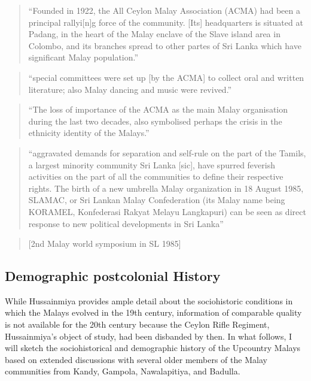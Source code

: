 \begin{quote}
    ``Founded in 1922, the All Ceylon Malay Association (ACMA) had been a principal rallyi[n]g force of the community. [Its] headquarters is situated at Padang, in the heart of the Malay enclave of the Slave island area in Colombo, and its branches spread to other partes of Sri Lanka which have significant Malay population.''\citet[21]{Hussainmiya1987}
\end{quote}



\begin{quote}
    ``special committees were set up [by the ACMA] to collect oral and written literature; also Malay dancing and music were revived.''\citet[21]{Hussainmiya1987}
\end{quote}

\begin{quote}
    ``The loss of importance of the ACMA as the main Malay organisation during the last two decades, also symbolised perhaps the crisis in the ethnicity identity of the Malays.''\citet[21]{Hussainmiya1987}
\end{quote}

\begin{quote}
    ``aggravated demands for separation and self-rule on the part of the Tamils, a largest minority community Sri Lanka [sic], have spurred feverish activities on the part of all the communities to define their respective rights. The birth of a new umbrella Malay organization in 18 August 1985, SLAMAC, or Sri Lankan Malay Confederation (its Malay name being KORAMEL, Konfederasi Rakyat Melayu Langkapuri) can be seen as direct response to new political developments in Sri Lanka''\citet[22]{Hussainmiya1987}
\end{quote}

\begin{quote}
    [2nd  Malay world symposium in SL 1985]
\end{quote}

\subsection{Demographic postcolonial History}\label{sec:slmbg:DemographicpostcolonialHistory}
While Hussainmiya provides ample detail about the sociohistoric conditions in which the Malays evolved in the 19th century, information of comparable quality is not available for the 20th century because the Ceylon Rifle Regiment, Hussainmiya's object of study, had been disbanded by then. In what follows, I will sketch the sociohistorical and demographic history of the Upcountry Malays based on extended discussions with several older members of the Malay communities from Kandy, Gampola, Nawalapitiya, and Badulla.

